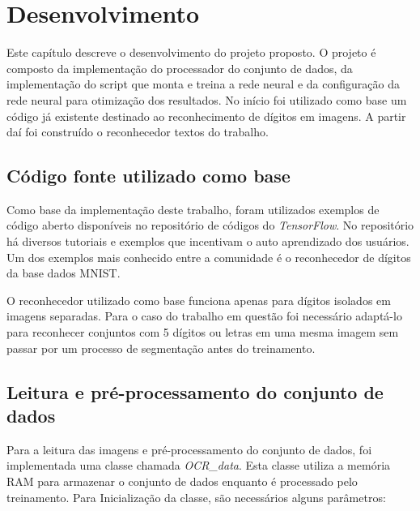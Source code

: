 \chapter{Desenvolvimento}

Este capítulo descreve o desenvolvimento do projeto proposto. O
projeto é composto da implementação do processador do conjunto de
dados, da implementação do script que monta e treina a rede neural e
da configuração da rede neural para otimização dos resultados. No
início foi utilizado como base um código já existente destinado ao
reconhecimento de dígitos em imagens. A partir daí foi construído o
reconhecedor textos do trabalho.

\section{Código fonte utilizado como base}

Como base da implementação deste trabalho, foram utilizados exemplos
de código aberto disponíveis no repositório de códigos do
\textit{TensorFlow}\cite{tensorCode}. No repositório há diversos
tutoriais e exemplos que incentivam o auto aprendizado dos
usuários. Um dos exemplos mais conhecido entre a comunidade é o
reconhecedor de dígitos da base dados MNIST\cite{mnist}.

O reconhecedor utilizado como base funciona apenas para dígitos
isolados em imagens separadas. Para o caso do trabalho em questão
foi necessário adaptá-lo para reconhecer conjuntos com 5 dígitos ou
letras em uma mesma imagem sem passar por um processo de segmentação
antes do treinamento.

\section{Leitura e pré-processamento do conjunto de dados}

Para a leitura das imagens e pré-processamento do conjunto de dados, foi
implementada uma classe chamada \textit{OCR\_data}. Esta classe utiliza
a memória RAM para armazenar o conjunto de dados enquanto é processado
pelo treinamento. Para Inicialização da classe, são necessários alguns
parâmetros:

